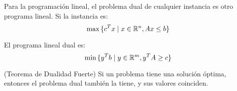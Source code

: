 Para la programación lineal, el problema dual de cualquier instancia es otro programa lineal. Si la instancia es:
$$\max{\{c^T x \mid x \in \mathbb{R}^n, Ax \leq b\}}$$

El programa lineal dual es:
$$\min{\{y^T b \mid y \in \mathbb{R}^m, y^T A \geq c\}}$$

\begin{theorem*}
    (Teorema de Dualidad Fuerte) Si un problema tiene una solución óptima, entonces el problema dual también la tiene, y sus valores coinciden.
\end{theorem*}
